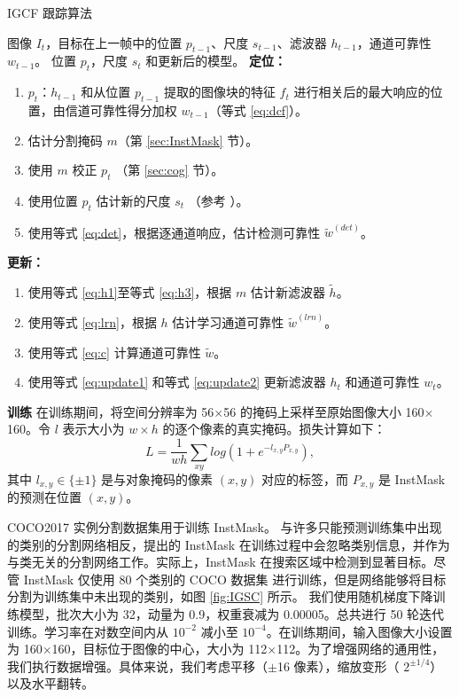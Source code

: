 \begin{algorithm}
  \caption{IGCF 跟踪算法} 
  \begin{algorithmic}
    \Require 图像 $I_t$，目标在上一帧中的位置 $p_{t-1}$、尺度 $s_{t-1}$、滤波器 $h_{t-1}$，通道可靠性 $w_{t-1}$。
    \Ensure 位置 $p_t$，尺度 $s_t$ 和更新后的模型。
  \Statex
  \State \textbf{定位：}
  \begin{enumerate}[leftmargin=0pt,itemindent=1.5em]
    \item $p_t$：$h_{t-1}$ 和从位置 $p_{t-1}$ 提取的图像块的特征 $f_{t}$ 进行相关后的最大响应的位置，由信道可靠性得分加权 $w_{t-1}$（等式 \ref{eq:dcf}）。
    \item 估计分割掩码 $m$（第 \ref{sec:InstMask} 节）。
    \item 使用 $m$ 校正 $p_t$ （第 \ref{sec:cog} 节）。
    \item 使用位置 $p_t$ 估计新的尺度 $s_ t$ （参考 \cite{Danelljan2014AccurateSE}）。
    \item 使用等式 \ref{eq:det}，根据逐通道响应，估计检测可靠性 $\tilde{w}^{(det)}$。
  \end{enumerate}
  \State \textbf{更新：}
  \begin{enumerate}[leftmargin=0pt,itemindent=1.5em]
    \item 使用等式 \ref{eq:h1}至等式 \ref{eq:h3}，根据 $m$ 估计新滤波器 $\tilde{h}$。
    \item 使用等式 \ref{eq:lrn}，根据 $h$ 估计学习通道可靠性 $\tilde{w}^{(lrn)}$。
    \item 使用等式 \ref{eq:c} 计算通道可靠性 $\tilde{w}$。
    \item 使用等式 \ref{eq:update1} 和等式 \ref{eq:update2} 更新滤波器 $h_t$ 和通道可靠性 $w_t$。
  \end{enumerate}
\end{algorithmic}
\end{algorithm}

\textbf{训练} 在训练期间，将空间分辨率为 56$\times$56 的掩码上采样至原始图像大小 160$\times$160。令 $l$ 表示大小为 $w \times h$ 的逐个像素的真实掩码。损失计算如下：
\begin{equation}
L = \frac{1}{wh} \sum_{xy}{log(1+e^{-l_{x,y}P_{x,y}})},
\end{equation}
其中 $l_{x,y} \in \{ \pm 1 \}$ 是与对象掩码的像素 $(x,y)$ 对应的标签，而 $P_{x,y}$ 是 InstMask 的预测在位置 $(x,y)$。

COCO2017 \cite{COCO} 实例分割数据集用于训练 InstMask。
与许多只能预测训练集中出现的类别的分割网络相反，提出的 InstMask 在训练过程中会忽略类别信息，并作为与类无关的分割网络工作。实际上，InstMask 在搜索区域中检测到显著目标。尽管 InstMask 仅使用 80 个类别的 COCO 数据集 \cite{COCO} 进行训练，但是网络能够将目标分割为训练集中未出现的类别，如图 \ref{fig:IGSC} 所示。
我们使用随机梯度下降训练模型，批次大小为 32，动量为 0.9，权重衰减为 0.00005。总共进行 50 轮迭代训练。学习率在对数空间内从 $10^{-2}$ 减小至 $10^{-4}$。在训练期间，输入图像大小设置为 160$\times$160，目标位于图像的中心，大小为 112$\times$112。为了增强网络的通用性，我们执行数据增强。具体来说，我们考虑平移（$\pm$16 像素），缩放变形（ $2^{\pm 1/4}$）以及水平翻转。

